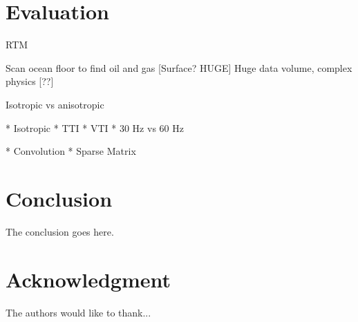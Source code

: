 \documentclass[conference]{IEEEtran}
\begin{document}
\section{Evaluation}

RTM

Scan ocean floor to find oil and gas [Surface? HUGE]
Huge data volume, complex physics [??]

Isotropic vs anisotropic

* Isotropic
* TTI
* VTI
* 30 Hz vs 60 Hz

* Convolution
* Sparse Matrix


\section{Conclusion}
The conclusion goes here.




\section*{Acknowledgment}


The authors would like to thank...







%
%
%




\end{document}
